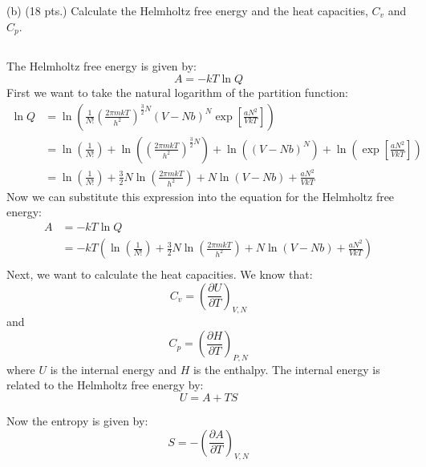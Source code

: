 \documentclass[10pt]{article}
\begin{document}
(b) (18 pts.) Calculate the Helmholtz free energy and the heat capacities, $C_{v}$ and $C_{p}$.
\subsection{}
The Helmholtz free energy is given by:
\begin{equation}
  A = - k T \ln Q
\end{equation}
First we want to take the natural logarithm of the partition function:
\begin{align}
  \ln Q &= \ln \left( \frac{1}{N !}\left(\frac{2 \pi m k T}{h^{2}}\right)^{\frac{3}{2} N}(V-N b)^{N} \exp \left[\frac{a N^{2}}{V k T}\right] \right) \\
&= \ln \left( \frac{1}{N !} \right) + \ln \left( \left(\frac{2 \pi m k T}{h^{2}}\right)^{\frac{3}{2} N} \right) + \ln \left( (V-N b)^{N} \right) + \ln \left( \exp \left[\frac{a N^{2}}{V k T}\right] \right) \\
&= \ln \left( \frac{1}{N !} \right) + \frac{3}{2} N \ln \left( \frac{2 \pi m k T}{h^{2}} \right) + N \ln \left( V-N b \right) + \frac{a N^{2}}{V k T}
\end{align}
Now we can substitute this expression into the equation for the Helmholtz free energy:
\begin{align}
  A &= - k T \ln Q \\
&= - k T \left( \ln \left( \frac{1}{N !} \right) + \frac{3}{2} N \ln \left( \frac{2 \pi m k T}{h^{2}} \right) + N \ln \left( V-N b \right) + \frac{a N^{2}}{V k T} \right) \\
\end{align}
Next, we want to calculate the heat capacities. We know that:
\begin{equation}
  C_{v} = \left( \frac{\partial U}{\partial T} \right)_{V,N}
\end{equation}
and
\begin{equation}
  C_{p} = \left( \frac{\partial H}{\partial T} \right)_{P,N}
\end{equation}
where $U$ is the internal energy and $H$ is the enthalpy. 
The internal energy is related to the Helmholtz free energy by:
\begin{equation}
  U = A + TS
\end{equation}

Now the entropy is given by:
\begin{equation}
  S = - \left( \frac{\partial A}{\partial T} \right)_{V,N}
\end{equation}
\end{document}
